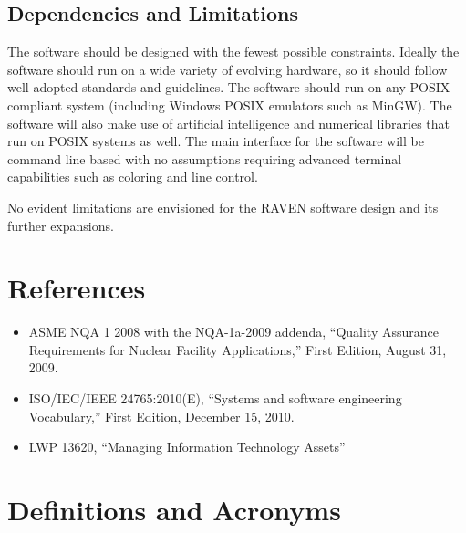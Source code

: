\subsection{Dependencies and Limitations}
The software should be designed with the fewest possible constraints. 
Ideally the software should run on a wide variety of evolving hardware, 
so it should follow well-adopted standards and guidelines. The software
 should run on any POSIX compliant system (including Windows POSIX 
 emulators such as MinGW). The software will also make use of artificial 
 intelligence and numerical libraries that run on POSIX systems as well. 
 The main interface for the software will be command line based with no 
 assumptions requiring advanced terminal capabilities such as coloring and line control. 

No evident limitations are envisioned for the RAVEN software design and its further expansions.

\section{References}

\begin{itemize}

  \item ASME NQA 1 2008 with the NQA-1a-2009 addenda, ``Quality Assurance Requirements for Nuclear Facility Applications,'' First Edition, August 31, 2009.
  \item ISO/IEC/IEEE 24765:2010(E), ``Systems and software engineering Vocabulary,'' First Edition, December 15, 2010.
  \item LWP 13620, ``Managing Information Technology Assets''
\end{itemize}


\section{Definitions and Acronyms}

